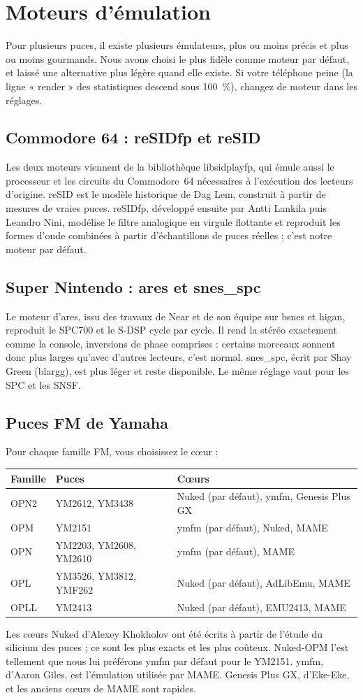 \chapter{Moteurs d'émulation}

Pour plusieurs puces, il existe plusieurs émulateurs, plus ou moins précis et plus ou moins gourmands. Nous avons
choisi le plus fidèle comme moteur par défaut, et laissé une alternative plus légère quand elle existe. Si votre
téléphone peine (la ligne « render » des statistiques descend sous 100~\%), changez de moteur dans les réglages.

\section{Commodore 64 : reSIDfp et reSID}
Les deux moteurs viennent de la bibliothèque libsidplayfp, qui émule aussi le processeur et les circuits du
Commodore~64 nécessaires à l'exécution des lecteurs d'origine. reSID est le modèle historique de Dag Lem, construit à
partir de mesures de vraies puces. reSIDfp, développé ensuite par Antti Lankila puis Leandro Nini, modélise le filtre
analogique en virgule flottante et reproduit les formes d'onde combinées à partir d'échantillons de puces réelles ;
c'est notre moteur par défaut.

\section{Super Nintendo : ares et snes\_spc}
Le moteur d'ares, issu des travaux de Near et de son équipe sur bsnes et higan, reproduit le SPC700 et le S-DSP cycle
par cycle. Il rend la stéréo exactement comme la console, inversions de phase comprises : certains morceaux sonnent
donc plus larges qu'avec d'autres lecteurs, c'est normal. snes\_spc, écrit par Shay Green (blargg), est plus léger et
reste disponible. Le même réglage vaut pour les SPC et les SNSF.

\section{Puces FM de Yamaha}
Pour chaque famille FM, vous choisissez le cœur :
\begin{longtable}{@{}l l p{}@{}}
\toprule \textbf{Famille} & \textbf{Puces} & \textbf{Cœurs} \\ \midrule
OPN2 & YM2612, YM3438 & Nuked (par défaut), ymfm, Genesis Plus GX \\
OPM & YM2151 & ymfm (par défaut), Nuked, MAME \\
OPN & YM2203, YM2608, YM2610 & ymfm (par défaut), MAME \\
OPL & YM3526, YM3812, YMF262 & Nuked (par défaut), AdLibEmu, MAME \\
OPLL & YM2413 & Nuked (par défaut), EMU2413, MAME \\
\bottomrule
\end{longtable}
Les cœurs Nuked d'Alexey Khokholov ont été écrits à partir de l'étude du silicium des puces ; ce sont les plus
exacts et les plus coûteux. Nuked-OPM l'est tellement que nous lui préférons ymfm par défaut pour le YM2151. ymfm, d'Aaron Giles, est l'émulation utilisée par MAME. Genesis Plus GX, d'Eke-Eke, et
les anciens cœurs de MAME sont rapides.

